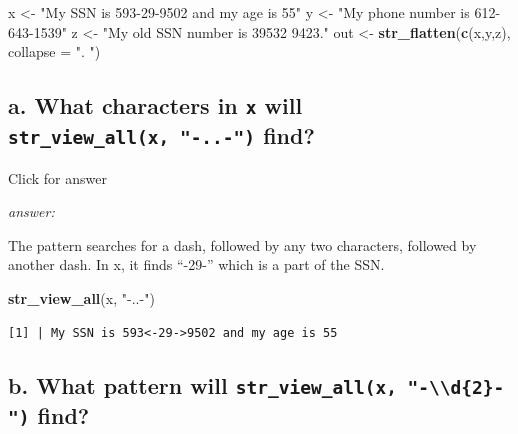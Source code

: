 \documentclass[
]{book}
\newenvironment{Shaded}{\begin{snugshade}}{\end{snugshade}}
\newcommand{\AttributeTok}[1]{\textcolor[rgb]{0.13,0.29,0.53}{#1}}
\newcommand{\FunctionTok}[1]{\textcolor[rgb]{0.13,0.29,0.53}{\textbf{#1}}}
\newcommand{\NormalTok}[1]{#1}
\newcommand{\OtherTok}[1]{\textcolor[rgb]{0.56,0.35,0.01}{#1}}
\newcommand{\StringTok}[1]{\textcolor[rgb]{0.31,0.60,0.02}{#1}}
\begin{document}
\begin{Shaded}
\begin{Highlighting}[]
\NormalTok{x }\OtherTok{\textless{}{-}} \StringTok{"My SSN is 593{-}29{-}9502 and my age is 55"}
\NormalTok{y }\OtherTok{\textless{}{-}} \StringTok{"My phone number is 612{-}643{-}1539"}
\NormalTok{z }\OtherTok{\textless{}{-}} \StringTok{"My old SSN number is 39532 9423."}
\NormalTok{out }\OtherTok{\textless{}{-}} \FunctionTok{str\_flatten}\NormalTok{(}\FunctionTok{c}\NormalTok{(x,y,z), }\AttributeTok{collapse =} \StringTok{". "}\NormalTok{)}
\end{Highlighting}
\end{Shaded}

\hypertarget{a.-what-characters-in-x-will-str_view_allx--..--find}{%
\subsection{\texorpdfstring{a. What characters in \texttt{x} will \texttt{str\_view\_all(x,\ "-..-")} find?}{a. What characters in x will str\_view\_all(x, "-..-") find?}}\label{a.-what-characters-in-x-will-str_view_allx--..--find}}

Click for answer

\emph{answer:}

The pattern searches for a dash, followed by any two characters, followed by another dash. In x, it finds ``-29-'' which is a part of the SSN.

\begin{Shaded}
\begin{Highlighting}[]
\FunctionTok{str\_view\_all}\NormalTok{(x, }\StringTok{"{-}..{-}"}\NormalTok{)}
\end{Highlighting}
\end{Shaded}

\begin{verbatim}
[1] | My SSN is 593<-29->9502 and my age is 55
\end{verbatim}

\hypertarget{b.-what-pattern-will-str_view_allx--d2--find}{%
\subsection{\texorpdfstring{b. What pattern will \texttt{str\_view\_all(x,\ "-\textbackslash{}\textbackslash{}d\{2\}-")} find?}{b. What pattern will str\_view\_all(x, "-\textbackslash\textbackslash d\{2\}-") find?}}\label{b.-what-pattern-will-str_view_allx--d2--find}}
\end{document}

